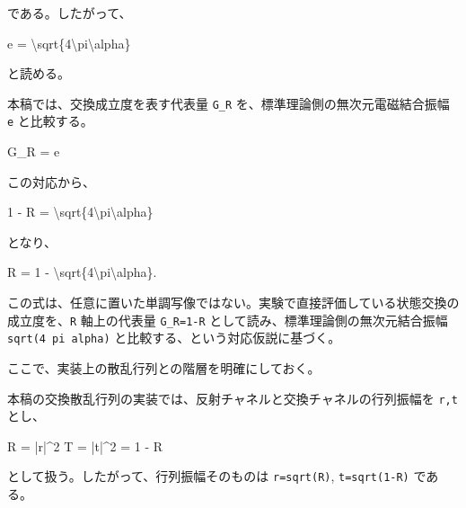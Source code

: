 \documentclass[
]{article}
\newenvironment{Shaded}{}{}
\newcommand{\NormalTok}[1]{#1}
\begin{document}
である。したがって、

\begin{Shaded}
\begin{Highlighting}[]
\NormalTok{e = \textbackslash{}sqrt\{4\textbackslash{}pi\textbackslash{}alpha\}}
\end{Highlighting}
\end{Shaded}

と読める。

本稿では、交換成立度を表す代表量 \texttt{G\_R}
を、標準理論側の無次元電磁結合振幅 \texttt{e} と比較する。

\begin{Shaded}
\begin{Highlighting}[]
\NormalTok{G\_R = e}
\end{Highlighting}
\end{Shaded}

この対応から、

\begin{Shaded}
\begin{Highlighting}[]
\NormalTok{1 {-} R = \textbackslash{}sqrt\{4\textbackslash{}pi\textbackslash{}alpha\}}
\end{Highlighting}
\end{Shaded}

となり、

\begin{Shaded}
\begin{Highlighting}[]
\NormalTok{R = 1 {-} \textbackslash{}sqrt\{4\textbackslash{}pi\textbackslash{}alpha\}.}
\end{Highlighting}
\end{Shaded}

この式は、任意に置いた単調写像ではない。実験で直接評価している状態交換の成立度を、\texttt{R}
軸上の代表量 \texttt{G\_R=1-R} として読み、標準理論側の無次元結合振幅
\texttt{sqrt(4\ pi\ alpha)} と比較する、という対応仮説に基づく。

ここで、実装上の散乱行列との階層を明確にしておく。

本稿の交換散乱行列の実装では、反射チャネルと交換チャネルの行列振幅を
\texttt{r,t} とし、

\begin{Shaded}
\begin{Highlighting}[]
\NormalTok{R = |r|\^{}2}
\NormalTok{T = |t|\^{}2 = 1 {-} R}
\end{Highlighting}
\end{Shaded}

として扱う。したがって、行列振幅そのものは
\texttt{\textbar{}r\textbar{}=sqrt(R)},
\texttt{\textbar{}t\textbar{}=sqrt(1-R)} である。
\end{document}
